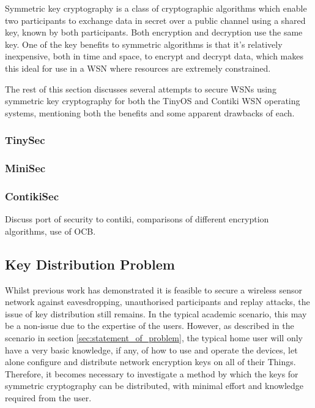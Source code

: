 \documentclass{mprop}
\begin{document}
Symmetric key cryptography is a class of cryptographic algorithms which enable two participants to exchange data in secret over a public channel using a shared key, known by both participants. Both encryption and decryption use the same key. One of the key benefits to symmetric algorithms is that it's relatively inexpensive, both in time and space, to encrypt and decrypt data, which makes this ideal for use in a WSN where resources are extremely constrained.

The rest of this section discusses several attempts to secure WSNs using symmetric key cryptography for both the TinyOS and Contiki WSN operating systems, mentioning both the benefits and some apparent drawbacks of each. 


\subsubsection{TinySec} %
\label{ssub:tinysec}


\subsubsection{MiniSec} %
\label{ssub:minisec}


\subsubsection{ContikiSec} %
\label{ssub:contikisec}

\cite{ContikiSec}
Discuss port of security to contiki, comparisons of different encryption algorithms, use of OCB. 

\subsection{Key Distribution Problem} %
\label{sub:key_distribution_problem}

Whilst previous work has demonstrated it is feasible to secure a wireless sensor network against eavesdropping, unauthorised participants and replay attacks, the issue of key distribution still remains.
In the typical academic scenario, this may be a non-issue due to the expertise of the users. However, as described in the scenario in section \ref{sec:statement_of_problem}, the typical home user will only have a very basic knowledge, if any, of how to use and operate the devices, let alone configure and distribute network encryption keys on all of their Things. Therefore, it becomes necessary to investigate a method by which the keys for symmetric cryptography can be distributed, with minimal effort and knowledge required from the user.
\end{document}
